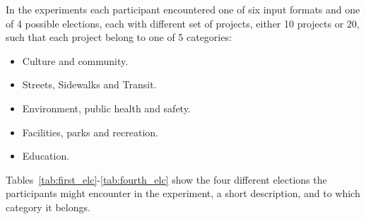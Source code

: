 \documentclass[10pt]{article}
\begin{document}
\begin{appendices}
In the experiments each participant encountered one of six input formats and one of 4 possible elections, each with different set of projects, either 10 projects or 20, such that each project belong to one of 5 categories:

\begin{itemize}
    \item Culture and community.
    \item Streets, Sidewalks and Transit.
    \item Environment, public health and safety.
    \item Facilities, parks and recreation.
    \item Education.
\end{itemize}

Tables~\ref{tab:first_elc}-\ref{tab:fourth_elc} show the four different elections the participants might encounter in the experiment, a short description, and to which category it belongs.


\end{appendices}
\end{document}
